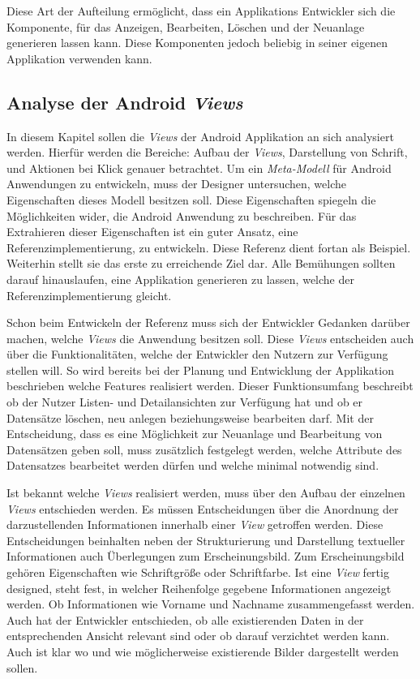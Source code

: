 Diese Art der Aufteilung ermöglicht, dass ein Applikations Entwickler sich die Komponente, für das Anzeigen, Bearbeiten, Löschen und der Neuanlage generieren lassen kann. Diese Komponenten jedoch beliebig in seiner eigenen Applikation verwenden kann.


\subsection{Analyse der Android \textit{Views}}
In diesem Kapitel sollen die \textit{Views} der Android Applikation an sich analysiert werden. Hierfür werden die Bereiche: Aufbau der \textit{Views}, Darstellung von Schrift, und Aktionen bei Klick genauer betrachtet. Um ein \textit{Meta-Modell} für Android Anwendungen zu entwickeln, muss der Designer untersuchen, welche Eigenschaften dieses Modell besitzen soll. Diese Eigenschaften spiegeln die Möglichkeiten wider, die Android Anwendung zu beschreiben. Für das Extrahieren dieser Eigenschaften ist ein guter Ansatz, eine Referenzimplementierung, zu entwickeln. Diese Referenz dient fortan als Beispiel. Weiterhin stellt sie das erste zu erreichende Ziel dar. Alle Bemühungen sollten darauf hinauslaufen, eine Applikation generieren zu lassen, welche der Referenzimplementierung gleicht.

Schon beim Entwickeln der Referenz muss sich der Entwickler Gedanken darüber machen, welche \textit{Views} die Anwendung besitzen soll. Diese \textit{Views} entscheiden auch über die Funktionalitäten, welche der Entwickler den Nutzern zur Verfügung stellen will. So wird bereits bei der Planung und Entwicklung der Applikation beschrieben welche Features realisiert werden. Dieser Funktionsumfang beschreibt ob der Nutzer Listen- und Detailansichten zur Verfügung hat und ob er Datensätze löschen, neu anlegen beziehungsweise bearbeiten darf. Mit der Entscheidung, dass es eine Möglichkeit zur Neuanlage und Bearbeitung von Datensätzen geben soll, muss zusätzlich festgelegt werden, welche Attribute des Datensatzes bearbeitet werden dürfen und welche minimal notwendig sind.

Ist bekannt welche \textit{Views} realisiert werden, muss über den Aufbau der einzelnen \textit{Views} entschieden werden. Es müssen Entscheidungen über die Anordnung der darzustellenden Informationen innerhalb einer \textit{View} getroffen werden. Diese Entscheidungen beinhalten neben der Strukturierung und Darstellung textueller Informationen auch Überlegungen zum Erscheinungsbild. Zum Erscheinungsbild gehören Eigenschaften wie Schriftgröße oder Schriftfarbe. Ist eine \textit{View} fertig designed, steht fest, in welcher Reihenfolge gegebene Informationen angezeigt werden. Ob Informationen wie Vorname und Nachname zusammengefasst werden. Auch hat der Entwickler entschieden, ob alle existierenden Daten in der entsprechenden Ansicht relevant sind oder ob darauf verzichtet werden kann.  Auch ist klar wo und wie möglicherweise existierende Bilder dargestellt werden sollen.

